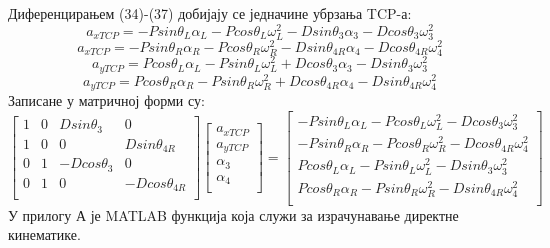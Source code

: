 \documentclass[12pt]{article}
\begin{document}
Диференцирањем (34)-(37) добијају се једначине убрзања TCP-а:
\begin{equation}
    a_{xTCP} = - Psin\theta_L\alpha_L - Pcos\theta_L\omega_L^2 - Dsin\theta_3\alpha_3 - Dcos\theta_3\omega_3^2
\end{equation}
\begin{equation}
    a_{xTCP} =  - Psin\theta_R\alpha_R - Pcos\theta_R\omega_R^2 - Dsin\theta_{4R}\alpha_4 - Dcos\theta_{4R}\omega_4^2
\end{equation}
\begin{equation}
    a_{yTCP} = Pcos\theta_L\alpha_L - Psin\theta_L\omega_L^2 + Dcos\theta_3\alpha_3 - Dsin\theta_3\omega_3^2 
\end{equation}
\begin{equation}
    a_{yTCP} = Pcos\theta_R\alpha_R - Psin\theta_R\omega_R^2 + Dcos\theta_{4R}\alpha_4 - Dsin\theta_{4R}\omega_4^2
\end{equation}
Записане у матричној форми су:
\begin{equation}
\begin{bmatrix}
1 & 0 & Dsin\theta_3 & 0\\
1 & 0 & 0 & Dsin\theta_{4R}\\
0 & 1 & -Dcos\theta_3 & 0\\
0 & 1 & 0 & -Dcos\theta_{4R}\\
\end{bmatrix}
\begin{bmatrix}
a_{xTCP}\\
a_{yTCP}\\
\alpha_3\\
\alpha_4\\
\end{bmatrix}
=
\begin{bmatrix}
- Psin\theta_L\alpha_L - Pcos\theta_L\omega_L^2 - Dcos\theta_3\omega_3^2\\
- Psin\theta_R\alpha_R - Pcos\theta_R\omega_R^2 - Dcos\theta_{4R}\omega_4^2\\
Pcos\theta_L\alpha_L - Psin\theta_L\omega_L^2 - Dsin\theta_3\omega_3^2\\
Pcos\theta_R\alpha_R - Psin\theta_R\omega_R^2 - Dsin\theta_{4R}\omega_4^2\\
\end{bmatrix}
\end{equation}
У прилогу А је MATLAB функција која служи за израчунавање директне кинематике.
\end{document}
